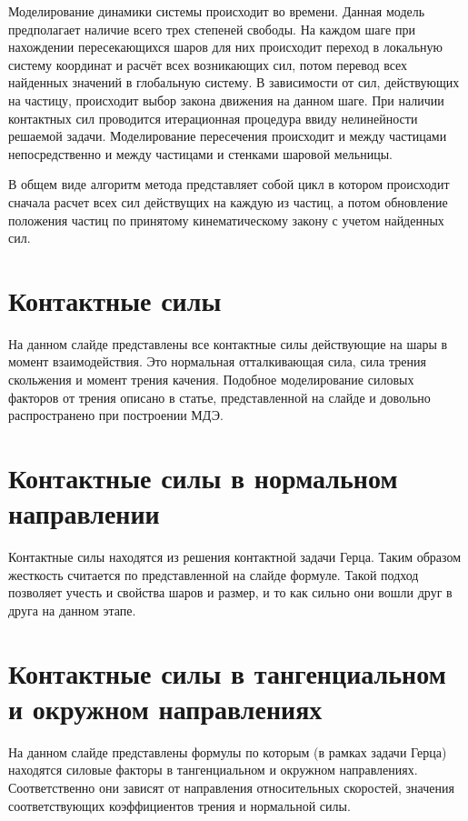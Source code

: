 \documentclass[a4paper]{article}
\begin{document}
Моделирование динамики системы происходит во времени.
Данная модель предполагает наличие всего трех степеней свободы.
На каждом шаге при нахождении пересекающихся шаров для них происходит переход в локальную систему координат и расчёт всех возникающих сил, потом перевод всех найденных значений в глобальную систему.
В зависимости от сил, действующих на частицу, происходит выбор закона движения на данном шаге.
При наличии контактных сил проводится итерационная процедура ввиду нелинейности решаемой задачи.
Моделирование пересечения происходит и между частицами непосредственно и между частицами и стенками шаровой мельницы.

В общем виде алгоритм метода представляет собой цикл в котором происходит сначала расчет всех сил действущих на каждую из частиц, а потом обновление положения частиц по принятому кинематическому закону с учетом найденных сил.



\section{Контактные силы}
На данном слайде представлены все контактные силы действующие на шары в момент взаимодействия.
Это нормальная отталкивающая сила, сила трения скольжения и момент трения качения.
Подобное моделирование силовых факторов от трения описано в статье, представленной на слайде и довольно распространено при построении МДЭ.

\section{Контактные силы в нормальном направлении}

Контактные силы находятся из решения контактной задачи Герца.
Таким образом жесткость считается по представленной на слайде формуле.
Такой подход позволяет учесть и свойства шаров и размер, и то как сильно они вошли друг в друга на данном этапе.

\section{Контактные силы в тангенциальном и окружном направлениях}

На данном слайде представлены формулы по которым (в рамках задачи Герца) находятся силовые факторы в тангенциальном и окружном направлениях. 
Соответственно они зависят от направления относительных скоростей, значения соответствующих коэффициентов трения и нормальной силы.
\end{document}
